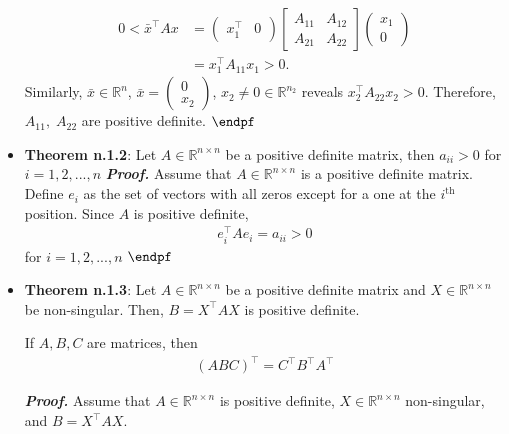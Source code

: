 \documentclass{report}
\begin{document}
\begin{itemize}
            \begin{align*}
                0 < \bar{x}^{\top} A x &= \begin{pmatrix} x_{1}^{\top} & 0 \end{pmatrix} \begin{bmatrix} A_{11} & A_{12} \\ A_{21} & A_{22} \end{bmatrix} \begin{pmatrix} x_{1} \\ 0 \end{pmatrix} \\
                    &= x_{1}^{\top}A_{11}x_{1} > 0
            .\end{align*}
            Similarly, $ \bar{x} \in \mathbb{R}^{n}$, $ \bar{x} = \begin{pmatrix} 0 \\ x_{2} \end{pmatrix} $, $ x_{2} \ne 0 \in \mathbb{R}^{n_{2}}$ reveals $x_{2}^{\top}A_{22}x_{2} > 0$.
            \bigbreak \noindent 
            Therefore, $A_{11},\; A_{22}$ are positive definite. $\endpf$
        \item \textbf{Theorem n.1.2}: Let $A \in \mathbb{R}^{n\times n}$ be a positive definite matrix, then $a_{ii} > 0$ for $i = 1,2,...,n $
            \bigbreak \noindent 
            \textbf{\textit{Proof.}} Assume that $A \in \mathbb{R}^{n\times n}$ is a positive definite matrix. Define $e_{i}$ as the set of vectors with all zeros except for a one at the $i^{\text{th}}$ position. Since $A$ is positive definite,
            \begin{align}
                e_{i}^{\top} A e_{i} = a_{ii} > 0
            \end{align}
            for $i = 1,2,...,n$ $ \endpf $
            \bigbreak \noindent 
        \item \textbf{Theorem n.1.3}: Let $A \in \mathbb{R}^{n \times n}$ be a positive definite matrix and $X \in \mathbb{R}^{n\times n}$ be non-singular. Then, $B = X^{\top}AX$ is positive definite.
            \bigbreak \noindent 
            \begin{remark}
                If $A,B,C$ are matrices, then     
                \begin{align*}
                    (ABC)^{\top} = C^{\top}B^{\top}A^{\top}
                \end{align*}
            \end{remark}
            \textbf{\textit{Proof.}} Assume that $A \in \mathbb{R}^{n\times n}$ is positive definite, $X\in \mathbb{R}^{n\times n}$ non-singular, and $B = X^{\top}AX$. 

\end{itemize}
\end{document}
